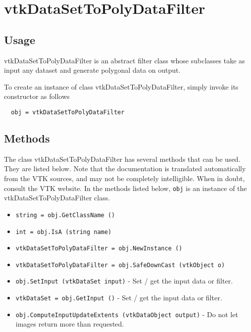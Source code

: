 \section{vtkDataSetToPolyDataFilter}

\subsection{Usage}

 vtkDataSetToPolyDataFilter is an abstract filter class whose subclasses 
 take as input any dataset and generate polygonal data on output.

To create an instance of class vtkDataSetToPolyDataFilter, simply
invoke its constructor as follows
\begin{verbatim}
  obj = vtkDataSetToPolyDataFilter
\end{verbatim}
\subsection{Methods}

The class vtkDataSetToPolyDataFilter has several methods that can be used.
  They are listed below.
Note that the documentation is translated automatically from the VTK sources,
and may not be completely intelligible.  When in doubt, consult the VTK website.
In the methods listed below, \verb|obj| is an instance of the vtkDataSetToPolyDataFilter class.
\begin{itemize}
\item  \verb|string = obj.GetClassName ()|

\item  \verb|int = obj.IsA (string name)|

\item  \verb|vtkDataSetToPolyDataFilter = obj.NewInstance ()|

\item  \verb|vtkDataSetToPolyDataFilter = obj.SafeDownCast (vtkObject o)|

\item  \verb|obj.SetInput (vtkDataSet input)| -  Set / get the input data or filter.

\item  \verb|vtkDataSet = obj.GetInput ()| -  Set / get the input data or filter.

\item  \verb|obj.ComputeInputUpdateExtents (vtkDataObject output)| -  Do not let images return more than requested.

\end{itemize}
